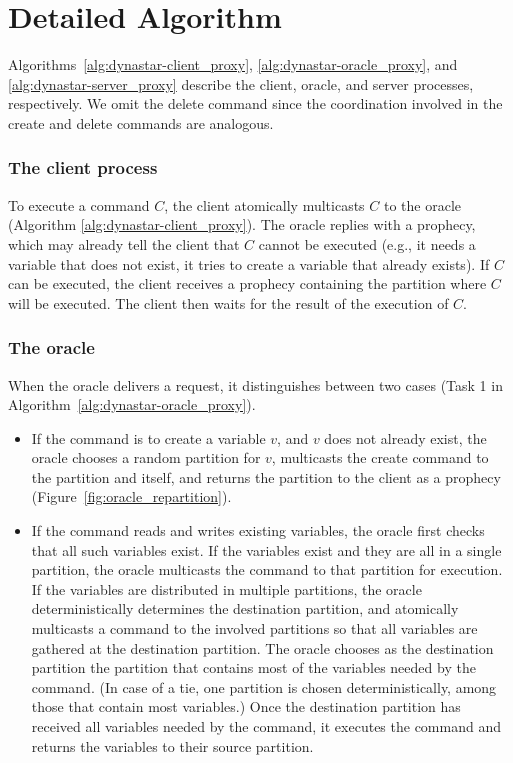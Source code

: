 \section{Detailed Algorithm}
\label{sec:dynastar-algo}

\label{sec:dynastar-detailed}






Algorithms~\ref{alg:dynastar-client_proxy}, \ref{alg:dynastar-oracle_proxy}, and
\ref{alg:dynastar-server_proxy} describe the client, oracle, and server processes,
respectively. We omit the delete command since the coordination involved in the
create and delete commands are analogous.

\subsubsection{The client process}

To execute a command $C$, the client atomically multicasts $C$ to the oracle
(Algorithm \ref{alg:dynastar-client_proxy}). The oracle replies with a prophecy,
which may already tell the client that $C$ cannot be executed (e.g., it needs a
variable that does not exist, it tries to create a variable that already
exists). If $C$ can be executed, the client receives a prophecy containing the
partition where $C$ will be executed. The client then waits for the result of
the execution of $C$.

\subsubsection{The oracle}

When the oracle delivers a request, it distinguishes between two cases (Task 1
in Algorithm~\ref{alg:dynastar-oracle_proxy}).
\begin{itemize}
\item If the command is to create a variable $v$, and $v$ does not already
exist, the oracle chooses a random partition for $v$, multicasts the create
command to the partition and itself, and returns the partition to the client as
a prophecy (Figure~\ref{fig:oracle_repartition}).
\item If the command reads and writes existing variables, the oracle first
checks that all such variables exist. If the variables exist and they are all in
a single partition, the oracle multicasts the command to that partition for
execution. If the variables are distributed in multiple partitions, the oracle
deterministically determines the destination partition, and atomically
multicasts a command to the involved partitions so that all variables are
gathered at the destination partition. The oracle chooses as the destination
partition the partition that contains most of the variables needed by the
command. (In case of a tie, one partition is chosen deterministically, among
those that contain most variables.) Once the destination partition has received
all variables needed by the command, it executes the command and returns the
variables to their source partition.

\end{itemize}


